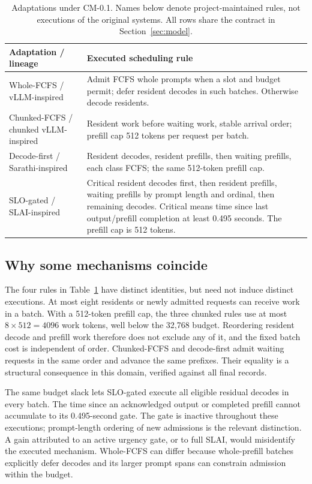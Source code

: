 \begin{table}[t]
\centering\small
\caption{Adaptations under CM-0.1. Names below denote project-maintained
rules, not executions of the original systems. All rows share the contract
in Section~\ref{sec:model}.}\label{tab:adaptations}
\begin{tabularx}{\linewidth}{lX}
\toprule Adaptation / lineage & Executed scheduling rule \\\midrule
Whole-FCFS / vLLM-inspired & Admit FCFS whole prompts when a slot and budget
permit; defer resident decodes in such batches. Otherwise decode residents. \\
Chunked-FCFS / chunked vLLM-inspired & Resident work before waiting work,
stable arrival order; prefill cap 512 tokens per request per batch. \\
Decode-first / Sarathi-inspired & Resident decodes, resident prefills,
then waiting prefills, each class FCFS; the same 512-token prefill cap. \\
SLO-gated / SLAI-inspired & Critical resident decodes first, then resident
prefills, waiting prefills by prompt length and ordinal, then remaining
decodes. Critical means time since last output/prefill completion at least
0.495 seconds. The prefill cap is 512 tokens. \\\bottomrule
\end{tabularx}
\end{table}

\subsection{Why some mechanisms coincide}
The four rules in Table~\ref{tab:adaptations} have distinct identities, but
need not induce distinct executions. At most eight residents or newly
admitted requests can receive work in a batch. With a 512-token prefill cap,
the three chunked rules use at most $8\times512=4096$ work tokens, well
below the 32,768 budget. Reordering resident decode and prefill work
therefore does not exclude any of it, and the fixed batch cost is
independent of order. Chunked-FCFS and decode-first admit waiting requests
in the same order and advance the same prefixes. Their equality is a
structural consequence in this domain, verified against all final records.

The same budget slack lets SLO-gated execute all eligible residual decodes
in every batch. The time since an acknowledged output or completed
prefill cannot accumulate to its 0.495-second gate. The gate is inactive
throughout these executions; prompt-length ordering of new admissions is
the relevant distinction. A gain attributed to an active urgency gate,
or to full SLAI, would misidentify the executed mechanism. Whole-FCFS can
differ because whole-prefill batches explicitly defer decodes and its
larger prompt spans can constrain admission within the budget.

